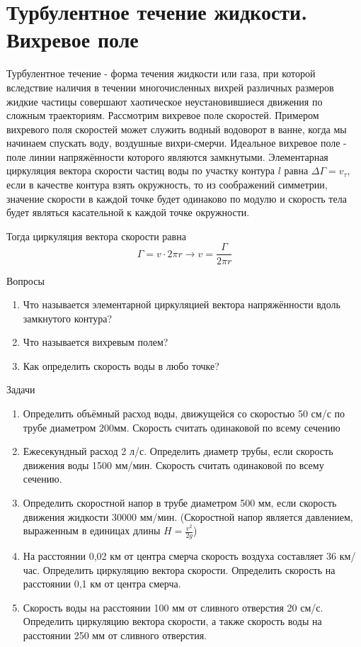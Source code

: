 \documentclass[a5paper, 10pt]{diss_4}
\renewcommand{\'}{\,'}
\begin{document}
\section{Турбулентное течение жидкости. Вихревое поле}

  Турбулентное течение - форма течения жидкости или газа, при которой
вследствие наличия в течении многочисленных вихрей различных размеров жидкие
частицы совершают хаотическое неустановившиеся движения по сложным траекториям.
 Рассмотрим вихревое поле скоростей. Примером вихревого поля скоростей может
служить водный водоворот в ванне, когда мы начинаем спускать воду, воздушные
вихри-смерчи. Идеальное вихревое поле - поле линии напряжённости которого
являются замкнутыми. Элементарная циркуляция вектора скорости частиц воды по
участку контура $l$ равна $\Delta\Gamma=v_\tau$, если в качестве контура взять
окружность, то из соображений симметрии, значение скорости в каждой точке будет
одинаково по модулю и скорость тела будет являться касательной к каждой точке
окружности.

Тогда циркуляция вектора скорости равна
\[
\Gamma=v\cdot2\pi r\to
v=\frac{\Gamma}{2\pi r}
\]

\begin{center}
   Вопросы
\end{center}
\begin{enumerate}
\item Что называется элементарной циркуляцией вектора напряжённости
 вдоль замкнутого контура?
\item Что называется вихревым полем?
\item Как определить скорость воды в любо точке?
\end{enumerate}

\begin{center}
   Задачи
\end{center}
\begin{enumerate}
\item Определить объёмный расход воды, движущейся со скоростью 50 см/с по
 трубе диаметром 200мм. Скорость считать одинаковой по всему сечению

\item Ежесекундный расход 2 л/с. Определить диаметр трубы, если скорость
 движения воды 1500 мм/мин. Скорость считать одинаковой по всему сечению.

\item Определить скоростной напор в трубе диаметром 500 мм, если скорость
 движения жидкости 30000 мм/мин. (Скоростной напор является давлением,
 выраженным в единицах длины $H=\frac{v^2}{2g}$)

\item На расстоянии 0,02 км от центра смерча скорость воздуха
составляет 36 км/час. Определить циркуляцию вектора скорости.
Определить скорость на расстоянии 0,1 км от центра смерча.

\item Скорость воды на расстоянии 100 мм от сливного отверстия 20 см/с.
Определить циркуляцию вектора скорости, а также скорость воды на
расстоянии 250 мм от сливного отверстия.
\end{enumerate}
\end{document}
